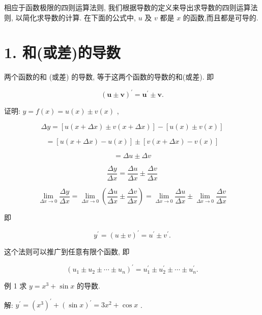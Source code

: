 \documentclass[lang=cn,newtx,12pt,scheme=chinese]{elegantbook}
\begin{document}
相应于函数极限的四则运算法则, 我们根据导数的定义来导出求导数的四则运算法则, 以简化求导数的计算. 在下面的公式中, \(u\) 及 \(v\) 都是 \(x\) 的函数,而且都是可导的.

\section*{1. 和(或差)的导数}

\begin{proposition}[导数和差法则]
两个函数的和 (或差) 的导数, 等于这两个函数的导数的和(或差). 即

\[
{\left( \mathbf{u} \pm \mathbf{v}\right) }^{\prime } = {\mathbf{u}}^{\prime } \pm \mathbf{v}.
\]

\end{proposition}

证明: \(y = f\left( x\right) = u\left( x\right) \pm v\left( x\right)\) ,

\[
{\Delta y} = \left\lbrack {u\left( {x + {\Delta x}}\right) \pm v\left( {x + {\Delta x}}\right) }\right\rbrack - \left\lbrack {u\left( x\right) \pm v\left( x\right) }\right\rbrack
\]

\[
= \left\lbrack {u\left( {x + {\Delta x}}\right) - u\left( x\right) }\right\rbrack \pm \left\lbrack {v\left( {x + {\Delta x}}\right) - v\left( x\right) }\right\rbrack
\]

\[
= {\Delta u} \pm {\Delta v}
\]

\[
\frac{\Delta y}{\Delta x} = \frac{\Delta u}{\Delta x} \pm \frac{\Delta v}{\Delta x}
\]

\[
\mathop{\lim }\limits_{{{\Delta x} \rightarrow 0}}\frac{\Delta y}{\Delta x} = \mathop{\lim }\limits_{{{\Delta x} \rightarrow 0}}\left( {\frac{\Delta u}{\Delta x} \pm \frac{\Delta v}{\Delta x}}\right) = \mathop{\lim }\limits_{{{\Delta x} \rightarrow 0}}\frac{\Delta u}{\Delta x} \pm \mathop{\lim }\limits_{{{\Delta x} \rightarrow 0}}\frac{\Delta v}{\Delta x}
\]

即

\[
{y}^{\prime } = {\left( u \pm v\right) }^{\prime } = {u}^{\prime } \pm {v}^{\prime }.
\]

这个法则可以推广到任意有限个函数, 即

\[
{\left( {u}_{1} \pm {u}_{2} \pm \cdots \pm {u}_{n}\right) }^{\prime } = {u}_{1}^{\prime } \pm {u}_{2}^{\prime } \pm \cdots \pm {u}_{n}^{\prime }.
\]

例 1 求 \(y = {x}^{3} + \sin x\) 的导数.

解: \({y}^{\prime } = {\left( {x}^{3}\right) }^{\prime } + {\left( \sin x\right) }^{\prime } = 3{x}^{2} + \cos x\) .
\end{document}
